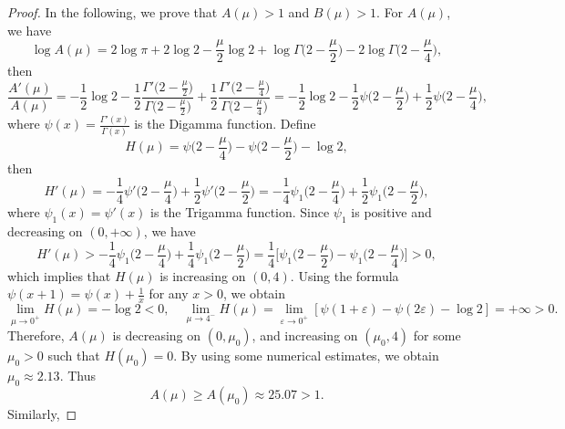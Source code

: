 \documentclass[11pt]{article}
\begin{document}
\begin{proof}
In the following, we prove that $A(\mu)>1$ and $B(\mu)>1$.
For $A(\mu)$, we have
\begin{equation*}
  \log A(\mu)=2\log \pi+2\log2-\frac{\mu}{2}\log 2+\log \Gamma\Big(2-\frac{\mu}{2}\Big)-2\log \Gamma\Big(2-\frac{\mu}{4}\Big),
\end{equation*}
then
\begin{equation*}
  \frac{A'(\mu)}{A(\mu)}=-\frac{1}{2}\log 2-\frac{1}{2}\frac{\Gamma'\big(2-\frac{\mu}{2}\big)}{\Gamma\big(2-\frac{\mu}{2}\big)}+
  \frac{1}{2}\frac{\Gamma'\big(2-\frac{\mu}{4}\big)}{\Gamma\big(2-\frac{\mu}{4}\big)}=-\frac{1}{2}\log 2-\frac{1}{2}\psi\Big(2-\frac{\mu}{2}\Big)+\frac{1}{2}\psi\Big(2-\frac{\mu}{4}\Big),
\end{equation*}
where $\psi(x)=\frac{\Gamma'(x)}{\Gamma(x)}$ is the Digamma function. Define
\begin{equation*}
  H(\mu)=\psi\Big(2-\frac{\mu}{4}\Big)-\psi\Big(2-\frac{\mu}{2}\Big)-\log 2,
\end{equation*}
then
\begin{equation*}
  H'(\mu)=-\frac{1}{4}\psi'\Big(2-\frac{\mu}{4}\Big)+\frac{1}{2}\psi'\Big(2-\frac{\mu}{2}\Big)=
  -\frac{1}{4}\psi_1\Big(2-\frac{\mu}{4}\Big)+\frac{1}{2}\psi_1\Big(2-\frac{\mu}{2}\Big),
\end{equation*}
where $\psi_1(x)=\psi'(x)$ is the Trigamma function. Since $\psi_1$ is positive and decreasing on $(0,+\infty)$, we have
\begin{equation*}
  H'(\mu)>
  -\frac{1}{4}\psi_1\Big(2-\frac{\mu}{4}\Big)+\frac{1}{4}\psi_1\Big(2-\frac{\mu}{2}\Big)=
  \frac{1}{4}\Big[\psi_1\Big(2-\frac{\mu}{2}\Big)-\psi_1\Big(2-\frac{\mu}{4}\Big)\Big]>0,
\end{equation*}
which implies that $H(\mu)$ is increasing on $(0,4)$.
Using the formula $\psi(x+1)=\psi(x)+\frac{1}{x}$ for any $x>0$, we obtain
\begin{equation*}
 \lim\limits _{\mu\rightarrow 0^+} H(\mu)=-\log 2<0,\quad
 \lim\limits _{\mu\rightarrow 4^-} H(\mu)=\lim\limits _{\varepsilon\rightarrow 0^+}[\psi(1+\varepsilon)-\psi(2\varepsilon)
-\log2] =+\infty>0.
\end{equation*}
Therefore, $A(\mu)$ is decreasing  on $(0,\mu_0)$, and increasing  on $(\mu_0,4)$ for some $\mu_0>0$ such that $H(\mu_0)=0$.
By using some numerical estimates, we obtain $\mu_0\approx 2.13$.
Thus
\begin{equation*}
  A(\mu)\geq A(\mu_0)\approx 25.07>1.
\end{equation*}
Similarly, %

\end{proof}
\end{document}
